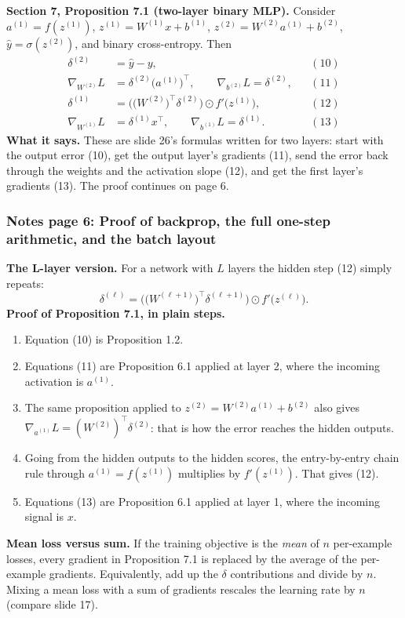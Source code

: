 \textbf{Section 7, Proposition 7.1 (two-layer binary MLP).} Consider $a^{(1)}=f(z^{(1)})$, $z^{(1)}=W^{(1)}x+b^{(1)}$, $z^{(2)}=W^{(2)}a^{(1)}+b^{(2)}$, $\hat{y}=\sigma(z^{(2)})$, and binary cross-entropy. Then
\[
\begin{aligned}
\delta^{(2)}&=\hat{y}-y, &&(10)\\
\nabla_{W^{(2)}}L&=\delta^{(2)}\big(a^{(1)}\big)^\top, \qquad \nabla_{b^{(2)}}L=\delta^{(2)}, &&(11)\\
\delta^{(1)}&=\Big(\big(W^{(2)}\big)^\top\delta^{(2)}\Big)\odot f'\big(z^{(1)}\big), &&(12)\\
\nabla_{W^{(1)}}L&=\delta^{(1)}x^\top, \qquad \nabla_{b^{(1)}}L=\delta^{(1)}. &&(13)
\end{aligned}
\]
\textbf{What it says.} These are slide 26's formulas written for two layers: start with the output error (10), get the output layer's gradients (11), send the error back through the weights and the activation slope (12), and get the first layer's gradients (13). The proof continues on page 6.

\subsubsection{Notes page 6: Proof of backprop, the full one-step arithmetic, and the batch layout}

\textbf{The L-layer version.} For a network with $L$ layers the hidden step (12) simply repeats:
\[
\delta^{(\ell)}=\Big(\big(W^{(\ell+1)}\big)^\top\delta^{(\ell+1)}\Big)\odot f'\big(z^{(\ell)}\big).
\]
\textbf{Proof of Proposition 7.1, in plain steps.}
\begin{enumerate}
\item Equation (10) is Proposition 1.2.
\item Equations (11) are Proposition 6.1 applied at layer 2, where the incoming activation is $a^{(1)}$.
\item The same proposition applied to $z^{(2)}=W^{(2)}a^{(1)}+b^{(2)}$ also gives $\nabla_{a^{(1)}}L=(W^{(2)})^\top\delta^{(2)}$: that is how the error reaches the hidden outputs.
\item Going from the hidden outputs to the hidden scores, the entry-by-entry chain rule through $a^{(1)}=f(z^{(1)})$ multiplies by $f'(z^{(1)})$. That gives (12).
\item Equations (13) are Proposition 6.1 applied at layer 1, where the incoming signal is $x$.
\end{enumerate}

\textbf{Mean loss versus sum.} If the training objective is the \emph{mean} of $n$ per-example losses, every gradient in Proposition 7.1 is replaced by the average of the per-example gradients. Equivalently, add up the $\delta$ contributions and divide by $n$. Mixing a mean loss with a sum of gradients rescales the learning rate by $n$ (compare slide 17).

